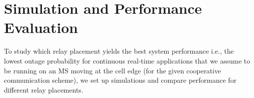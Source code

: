 \section{Simulation and Performance Evaluation}
\label{sec:Simulation}
To study which relay placement yields the best system performance i.e., the lowest outage probability for continuous real-time applications that we assume to be running on an MS moving at the cell edge (for the given cooperative communication scheme), we set up simulations and compare performance for different relay placements.

